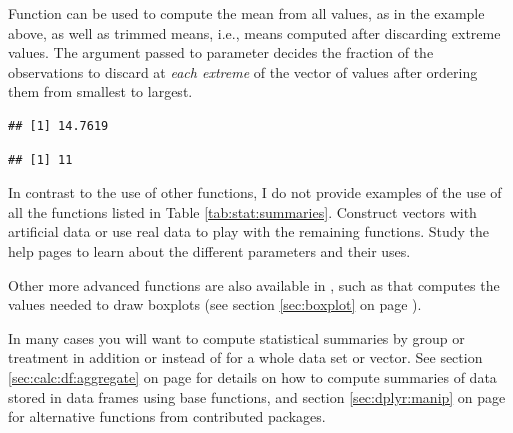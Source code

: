 \documentclass[krantz2]{krantz}\usepackage{knitr}
\begin{document}
Function  can be used to compute the mean from all values, as in the example above, as well as trimmed means, i.e., means computed after discarding extreme values. The argument passed to parameter  decides the fraction of the observations to discard at \emph{each extreme} of the vector of values after ordering them from smallest to largest.

\begin{knitrout}\footnotesize
{}\color{fgcolor}\begin{kframe}
\begin{alltt}
 \hlkwb{<-} \hlstd{(}\hlopt{:}\hlstd{,} \hlstd{)}
\end{alltt}
\begin{verbatim}
## [1] 14.7619
\end{verbatim}
\begin{alltt}
  \hlstd{=} \hlstd{)}
\end{alltt}
\begin{verbatim}
## [1] 11
\end{verbatim}
\end{kframe}
\end{knitrout}

\begin{playground}
  In contrast to the use of other functions, I do not provide examples of the use of all the functions listed in Table \ref{tab:stat:summaries}. Construct  vectors with artificial data or use real data to play with the remaining functions. Study the help pages to learn about the different parameters and their uses.%
\end{playground}

Other more advanced functions are also available in \Rlang, such as  that computes the values needed to draw boxplots (see section \ref{sec:boxplot} on page \pageref{sec:boxplot}).

\begin{infobox}
  In many cases you will want to compute statistical summaries by group or treatment in addition or instead of for a whole data set or vector. See section \ref{sec:calc:df:aggregate} on page \pageref{sec:calc:df:aggregate} for details on how to compute summaries of data stored in data frames using base \Rlang functions, and section \ref{sec:dplyr:manip} on page \pageref{sec:dplyr:manip} for alternative functions from contributed packages.
\end{infobox}
\end{document}
